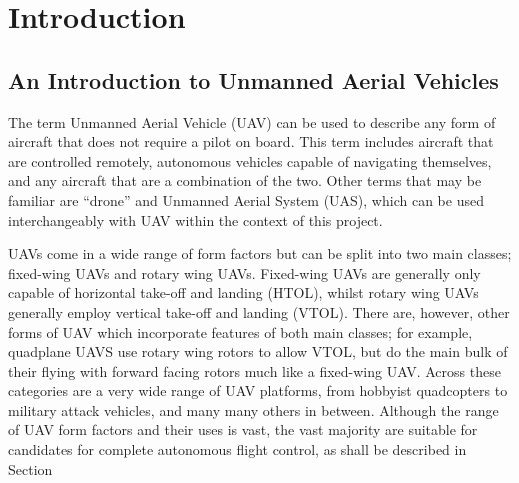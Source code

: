 
\chapter{Introduction}  %
\label{intro}

\ifpdf
    \graphicspath{{Chapter1/Figs/Raster/}{Chapter1/Figs/PDF/}{Chapter1/Figs/}}
\else
    \graphicspath{{Chapter1/Figs/Vector/}{Chapter1/Figs/}}
\fi


\section{An Introduction to Unmanned Aerial Vehicles} 
\label{intro:UAVs}

The term Unmanned Aerial Vehicle (UAV) can be used to describe any form of aircraft that does not require a pilot on board. This term includes aircraft that are controlled remotely, autonomous vehicles capable of navigating themselves, and any aircraft that are a combination of the two. Other terms that may be familiar are ``drone'' and Unmanned Aerial System (UAS), which can be used interchangeably with UAV within the context of this project. 

UAVs come in a wide range of form factors but can be split into two main classes; fixed-wing UAVs and rotary wing UAVs. Fixed-wing UAVs are generally only capable of horizontal take-off and landing (HTOL), whilst rotary wing UAVs generally employ vertical take-off and landing (VTOL). There are, however, other forms of UAV which incorporate features of both main classes; for example, quadplane UAVS use rotary wing rotors to allow VTOL, but do the main bulk of their flying with forward facing rotors much like a fixed-wing UAV. Across these categories are a very wide range of UAV platforms, from hobbyist quadcopters to military attack vehicles, and many many others in between. %
Although the range of UAV form factors and their uses is vast, the vast majority are suitable for candidates for complete autonomous flight control, as shall be described in Section %
 
